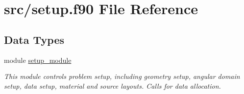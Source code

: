 \hypertarget{setup_8f90}{\section{src/setup.f90 File Reference}
\label{setup_8f90}
}
\subsection*{Data Types}
\begin{DoxyCompactItemize}
\item 
module \hyperlink{classsetup__module}{setup\-\_\-module}
\begin{DoxyCompactList}\small\item\em This module controls problem setup, including geometry setup, angular domain setup, data setup, material and source layouts. Calls for data allocation. \end{DoxyCompactList}\end{DoxyCompactItemize}
